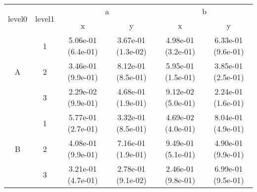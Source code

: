 \begin{tabular}{cccccc}
\toprule
\multirow{2}{*}{level0} & \multirow{2}{*}{level1}&\multicolumn{2}{c}{a}&\multicolumn{2}{c}{b}\tabularnewline
\cmidrule(lr){3-4}
\cmidrule(lr){5-6}
&&x&y&x&y\tabularnewline
\midrule
\multirow{3}{*}{A}&1& 5.06e-01 (6.4e-01)& 3.67e-01 (1.3e-02)& 4.98e-01 (3.2e-01)& 6.33e-01 (9.6e-01)\tabularnewline
&2& 3.46e-01 (9.9e-01)& 8.12e-01 (8.5e-01)& 5.95e-01 (1.5e-01)& 3.85e-01 (2.5e-01)\tabularnewline
&3& 2.29e-02 (9.9e-01)& 4.68e-01 (1.9e-01)& 9.12e-02 (5.0e-01)& 2.24e-01 (1.6e-01)\tabularnewline
\midrule
\multirow{3}{*}{B}&1& 5.77e-01 (2.7e-01)& 3.32e-01 (8.5e-01)& 4.69e-02 (4.0e-01)& 8.04e-01 (4.9e-01)\tabularnewline
&2& 4.08e-01 (9.9e-01)& 7.16e-01 (1.9e-01)& 9.49e-01 (5.1e-01)& 4.90e-01 (9.9e-01)\tabularnewline
&3& 3.21e-01 (4.7e-01)& 2.78e-01 (9.1e-02)& 2.46e-01 (9.8e-01)& 6.99e-01 (9.5e-01)\tabularnewline
\bottomrule
\end{tabular}
